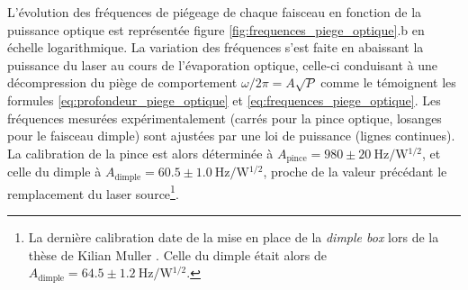 L'évolution des fréquences de piégeage de chaque faisceau en fonction de la puissance optique est représentée figure \ref{fig:frequences_piege_optique}.b en échelle logarithmique. La variation des fréquences s'est faite en abaissant la puissance du laser au cours de l'évaporation optique, celle-ci conduisant à une décompression du piège de comportement $\omega /2\pi =A \sqrt{P}$ comme le témoignent les formules \ref{eq:profondeur_piege_optique} et \ref{eq:frequences_piege_optique}. Les fréquences mesurées expérimentalement (carrés pour la pince optique, losanges pour le faisceau dimple) sont ajustées par une loi de puissance (lignes continues). La calibration de la pince est alors déterminée à $A_{\mathrm{pince}}=980\pm \SI{20}{\hertz\per\watt^{1/2}}$, et celle du dimple à $A_{\mathrm{dimple}}=60.5\pm \SI{1.0}{\hertz\per\watt^{1/2}}$, proche de la valeur précédant le remplacement du laser source\footnote{La dernière calibration date de la mise en place de la \emph{dimple box} lors de la thèse de Kilian Muller \citep{muller2015coherent}. Celle du dimple était alors de $A_{\mathrm{dimple}}=64.5\pm \SI{1.2}{\hertz\per\watt^{1/2}}$.}.



















